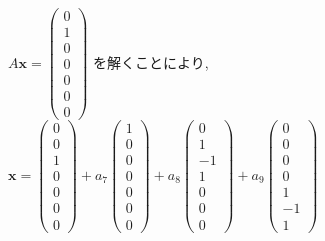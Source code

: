 \documentclass{jsarticle}
\begin{document}
$A\bm{x} = \begin{pmatrix} 0 \\ 1 \\ 0 \\ 0 \\ 0 \\ 0 \\ 0 \end{pmatrix}$ を解くことにより, 
$\bm{x} = \begin{pmatrix} 0 \\ 0 \\ 1 \\ 0 \\ 0 \\ 0 \\ 0 \end{pmatrix} + a_7\begin{pmatrix} 1 \\ 0 \\ 0 \\ 0 \\ 0 \\ 0 \\ 0\end{pmatrix} + a_8\begin{pmatrix} 0 \\ 1 \\ -1 \\ 1 \\ 0 \\ 0 \\ 0 \end{pmatrix} + a_9\begin{pmatrix} 0 \\ 0 \\ 0 \\ 0 \\ 1 \\ -1 \\ 1 \end{pmatrix}$
\end{document}

